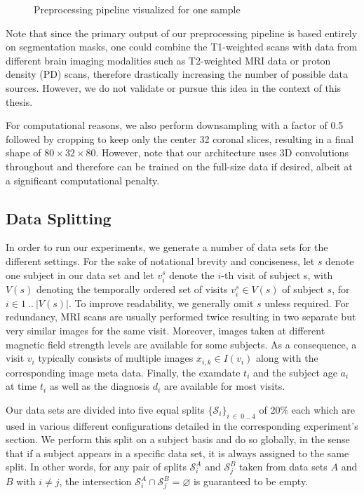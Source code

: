 \begin{figure}
	\noindent\makebox[1.1\textwidth]{
		\centering
		
	}
	\caption{Preprocessing pipeline visualized for one sample} \label{fig:preproc}
\end{figure}

Note that since the primary output of our preprocessing pipeline is based entirely on segmentation masks, one could combine the T1-weighted scans with data from different brain imaging modalities such as T2-weighted MRI data or proton density (PD) scans, therefore drastically increasing the number of possible data sources. However, we do not validate or pursue this idea in the context of this thesis.

For computational reasons, we also perform downsampling with a factor of 0.5 followed by cropping to keep only the center 32 coronal slices, resulting in a final shape of $ 80 \times 32 \times 80 $. However, note that our architecture uses 3D convolutions throughout and therefore can be trained on the full-size data if desired, albeit at a significant computational penalty.

\subsection{Data Splitting} \label{sec:dat}
In order to run our experiments, we generate a number of data sets for the different settings. For the sake of notational brevity and conciseness, let $s$ denote one subject in our data set and let $v^s_i$ denote the $i$-th visit of subject s, with $V(s)$ denoting the temporally ordered set of visits $v^s_i \in V(s)$ of subject $s$, for $i \in 1 \ ..\ |V(s)|$. To improve readability, we generally omit $s$ unless required. For redundancy, MRI scans are usually performed twice resulting in two separate but very similar images for the same visit. Moreover, images taken at different magnetic field strength levels are available for some subjects. As a consequence, a visit $v_i$ typically consists of multiple images $x_{i, k} \in I(v_i)$ along with the corresponding image meta data. Finally, the examdate $t_i$ and the subject age $a_i$ at time $t_i$ as well as the diagnosis $d_i$ are available for most visits.

Our data sets are divided into five equal splits $ \{ \mathcal{S}_i \}_{i\ \in\ 0\;..\;4} $ of 20\% each which are used in various different configurations detailed in the corresponding experiment's section. We perform this split on a subject basis and do so globally, in the sense that if a subject appears in a specific data set, it is always assigned to the same split. In other words, for any pair of splits $ \mathcal{S}_i^A $ and $ \mathcal{S}_j^B $ taken from data sets $A$ and $B$ with $ i \neq j $, the intersection $ { \mathcal{S}_i^A \cap \mathcal{S}_j^B = \varnothing } $ is guaranteed to be empty.

